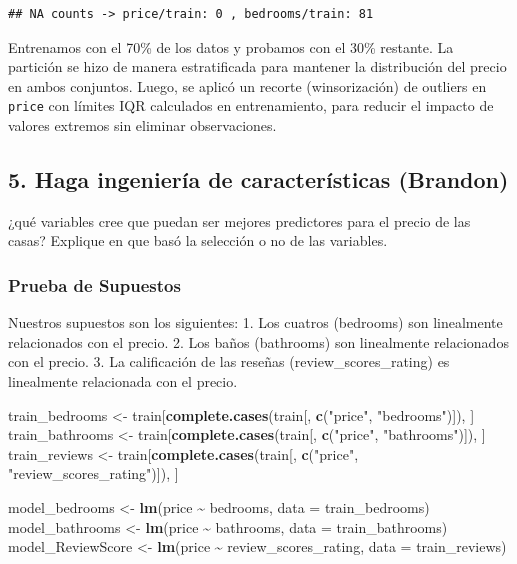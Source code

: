\documentclass[
]{article}
\newenvironment{Shaded}{\begin{snugshade}}{\end{snugshade}}
\newcommand{\AttributeTok}[1]{\textcolor[rgb]{0.13,0.29,0.53}{#1}}
\newcommand{\FunctionTok}[1]{\textcolor[rgb]{0.13,0.29,0.53}{\textbf{#1}}}
\newcommand{\NormalTok}[1]{#1}
\newcommand{\OtherTok}[1]{\textcolor[rgb]{0.56,0.35,0.01}{#1}}
\newcommand{\SpecialCharTok}[1]{\textcolor[rgb]{0.81,0.36,0.00}{\textbf{#1}}}
\newcommand{\StringTok}[1]{\textcolor[rgb]{0.31,0.60,0.02}{#1}}
\begin{document}
\begin{verbatim}
## NA counts -> price/train: 0 , bedrooms/train: 81
\end{verbatim}

Entrenamos con el 70\% de los datos y probamos con el 30\% restante. La
partición se hizo de manera estratificada para mantener la distribución
del precio en ambos conjuntos. Luego, se aplicó un recorte
(winsorización) de outliers en \texttt{price} con límites IQR calculados
en entrenamiento, para reducir el impacto de valores extremos sin
eliminar observaciones.

\subsection{5. Haga ingeniería de características
(Brandon)}\label{haga-ingenieruxeda-de-caracteruxedsticas-brandon}

¿qué variables cree que puedan ser mejores predictores para el precio de
las casas? Explique en que basó la selección o no de las variables.

\subsubsection{Prueba de Supuestos}\label{prueba-de-supuestos}

Nuestros supuestos son los siguientes: 1. Los cuatros (bedrooms) son
linealmente relacionados con el precio. 2. Los baños (bathrooms) son
linealmente relacionados con el precio. 3. La calificación de las
reseñas (review\_scores\_rating) es linealmente relacionada con el
precio.

\begin{Shaded}
\begin{Highlighting}[]
\NormalTok{train\_bedrooms }\OtherTok{\textless{}{-}}\NormalTok{ train[}\FunctionTok{complete.cases}\NormalTok{(train[, }\FunctionTok{c}\NormalTok{(}\StringTok{"price"}\NormalTok{, }\StringTok{"bedrooms"}\NormalTok{)]), ]}
\NormalTok{train\_bathrooms }\OtherTok{\textless{}{-}}\NormalTok{ train[}\FunctionTok{complete.cases}\NormalTok{(train[, }\FunctionTok{c}\NormalTok{(}\StringTok{"price"}\NormalTok{, }\StringTok{"bathrooms"}\NormalTok{)]), ]}
\NormalTok{train\_reviews }\OtherTok{\textless{}{-}}\NormalTok{ train[}\FunctionTok{complete.cases}\NormalTok{(train[, }\FunctionTok{c}\NormalTok{(}\StringTok{"price"}\NormalTok{, }\StringTok{"review\_scores\_rating"}\NormalTok{)]), ]}

\NormalTok{model\_bedrooms }\OtherTok{\textless{}{-}} \FunctionTok{lm}\NormalTok{(price }\SpecialCharTok{\textasciitilde{}}\NormalTok{ bedrooms, }\AttributeTok{data =}\NormalTok{ train\_bedrooms)}
\NormalTok{model\_bathrooms }\OtherTok{\textless{}{-}} \FunctionTok{lm}\NormalTok{(price }\SpecialCharTok{\textasciitilde{}}\NormalTok{ bathrooms, }\AttributeTok{data =}\NormalTok{ train\_bathrooms)}
\NormalTok{model\_ReviewScore }\OtherTok{\textless{}{-}} \FunctionTok{lm}\NormalTok{(price }\SpecialCharTok{\textasciitilde{}}\NormalTok{ review\_scores\_rating, }\AttributeTok{data =}\NormalTok{ train\_reviews)}
\end{Highlighting}
\end{Shaded}
\end{document}
